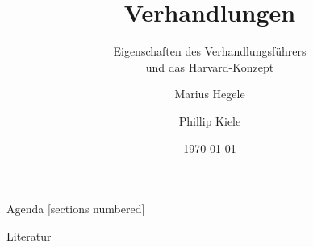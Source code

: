 \documentclass[10pt]{beamer}
\title{Verhandlungen}
\subtitle{Eigenschaften des Verhandlungsführers \\und das Harvard-Konzept}
\date{\today}
\author[8786673 \and 3711191]{Marius Hegele \and Phillip Kiele}
\institute{Consulting TINF17A \\DHBW Stuttgart}
\begin{document}
	
	\begin{frame}[plain]
		\maketitle
	\end{frame}
	
	\begin{frame}{Agenda}
		[sections numbered]
		\tableofcontents[hideallsubsections]
	\end{frame}

	
	

	\appendix

	\begin{frame}[plain]
		\maketitle
	\end{frame}

	\begin{frame}[allowframebreaks]{Literatur}
		\printbibliography[heading = none]
	\end{frame}
\end{document}
